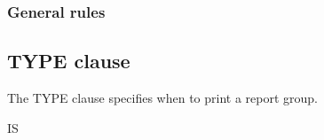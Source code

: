 \subsubsection{General rules}

\subsection{TYPE clause}

The TYPE clause specifies when to print a report group.

\begin{syntax}
   IS
  \begin{1=}
    \begin{1=}
      \begin{1=}
          \\
      \end{1=} \\
      \begin{1=}
          \\
      \end{1=}
    \end{1=}
    \begin{1=}
      \identifier \\
    \end{1=}
    \begin{0-1}
       
    \end{0-1} \\

    \begin{1=}
       \\
    \end{1=} \\

    \begin{1=}
        \\
    \end{1=} \\

    \begin{1=}
        \\
    \end{1=} \\

    \begin{1=}
        \\
    \end{1=} \\

    \begin{1=}
        \\
    \end{1=}
  \end{1=}
\end{syntax}


